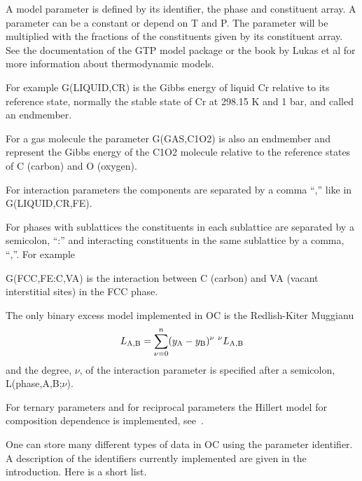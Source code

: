 \documentclass[12pt]{article}
\begin{document}
A model parameter is defined by its identifier, the phase and
constituent array.  A parameter can be a constant or depend on T and
P.  The parameter will be multiplied with the fractions of the
constituents given by its constituent array.  See the documentation of
the GTP model package or the book by Lukas et al\cite{07Luk} for more
information about thermodynamic models.

For example G(LIQUID,CR) is the Gibbs energy of liquid Cr relative to
its reference state, normally the stable state of Cr at 298.15 K and 1
bar, and called an endmember.

For a gas molecule the parameter G(GAS,C1O2) is also an endmember and
represent the Gibbs energy of the C1O2 molecule relative to the
reference states of C (carbon) and O (oxygen).

For interaction parameters the components are separated by a comma
``,'' like in G(LIQUID,CR,FE).

For phases with sublattices the constituents in each sublattice
are separated by a semicolon, ``:'' and interacting constituents in
the same sublattice by a comma, ``,''.  For example

G(FCC,FE:C,VA) is the interaction between C (carbon) and VA (vacant
interstitial sites) in the FCC phase.

The only binary excess model implemented in OC is the Redlish-Kiter
Muggianu
\begin{eqnarray*}
L_{\rm A,B} = \sum_{\nu=0}^n (y_{\rm A} - y_{\rm B})^{\nu} ~^{\nu}L_{\rm A,B}
\end{eqnarray*}
and the degree, $\nu$, of the interaction parameter is specified after
a semicolon, L(phase,A,B;$\nu$).

For ternary parameters and for reciprocal parameters the Hillert model
for composition dependence is implemented, see~\cite{07Luk}.

One can store many different types of data in OC using the parameter
identifier.  A description of the identifiers currently implemented
are given in the introduction.  Here is a short list.
\end{document}
